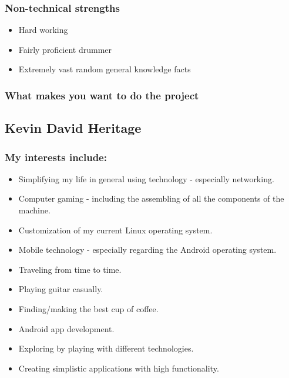 \documentclass{article}
\begin{document}
	\subsubsection{Non-technical strengths}
	\begin{itemize}
		\item Hard working
		\item Fairly proficient drummer
		\item Extremely vast random general knowledge facts
	\end{itemize}
	\subsubsection{What makes you want to do the project}
	
	\subsection{Kevin David Heritage}
	\subsubsection{My interests include: }
	\begin{itemize}
		\item Simplifying my life in general using technology - especially networking.
		\item Computer gaming - including the assembling of all the components of the machine.
		\item Customization of my current Linux operating system.
		\item Mobile technology - especially regarding the Android operating system.
		\item Traveling from time to time.
		\item Playing guitar casually.
		\item Finding/making the best cup of coffee.
		\item Android app development.
		\item Exploring by playing with different technologies.
		\item Creating simplistic applications with high functionality.
	\end{itemize}
\end{document}
